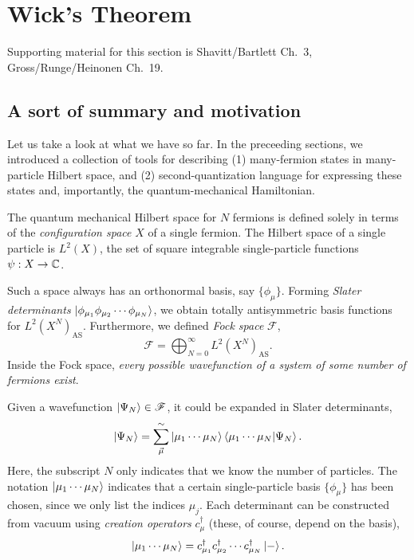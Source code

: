 \documentclass{report}
\theoremstyle{plain}
\theoremstyle{definition}
\begin{document}
\section{Wick's Theorem}

Supporting material for this section is Shavitt/Bartlett Ch.~3,
Gross/Runge/Heinonen Ch.~19.

\subsection{A sort of summary and motivation}

Let us take a look at what we have so far. In the preceeding sections, 
we introduced a collection of tools for describing (1) many-fermion
states in many-particle Hilbert space, and (2) second-quantization
language for expressing these states and, importantly, the
quantum-mechanical Hamiltonian.

The quantum mechanical Hilbert space for $N$ fermions is defined
solely in terms of the \emph{configuration space} $X$ of a single
fermion. The Hilbert space of a single particle is $L^2(X)$, the set of square
integrable single-particle functions $\psi : X \to \mathbb{C}$. 

Such a space always has an orthonormal basis, say
$\{\phi_\mu\}$. Forming \emph{Slater determinants}
$\ket{\phi_{\mu_1}\phi_{\mu_2}\cdots \phi_{\mu_N}}$, we obtain totally
antisymmetric basis functions for $L^2(X^N)_\text{AS}$. Furthermore,
we defined \emph{Fock space} $\mathscr{F}$,
\[\mathscr{F} = \bigoplus_{N=0}^\infty L^2(X^N)_\text{AS}. \]
Inside the Fock space, \emph{every possible wavefunction of a system
  of some number of fermions exist}. 


Given a wavefunction $\ket{\Psi_N} \in \mathscr{F}$, it could be
expanded in Slater determinants,
\begin{equation}
  \ket{\Psi_N} = \sum_{\vec{\mu}}^\sim \ket{\mu_1\cdots\mu_N}
  \braket{\mu_1\cdots\mu_N|\Psi_N}. 
\end{equation}
Here, the subscript $N$ only indicates that we know the number of
particles.  The notation $\ket{\mu_1\cdots\mu_N}$ indicates that a
certain single-particle basis $\{\phi_\mu\}$ has been chosen, since we
only list the indices $\mu_j$.  Each determinant can be constructed
from vacuum using \emph{creation operators} $c^\dag_\mu$ (these, of
course, depend on the basis),
\begin{equation}
  \ket{\mu_1\cdots\mu_N} = c^\dag_{\mu_1} c^\dag_{\mu_2} \cdots
  c^\dag_{\mu_N} \ket{-}.
\end{equation}
\end{document}
